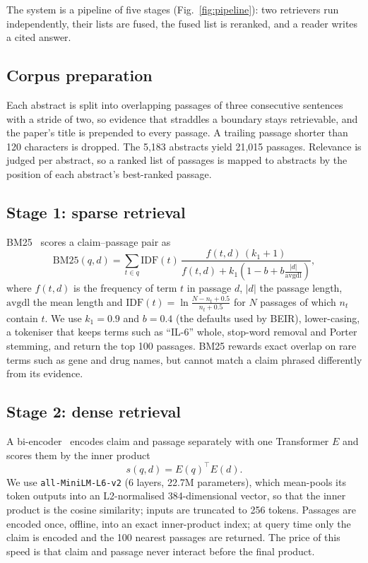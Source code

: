 \documentclass[runningheads]{llncs}
\begin{document}
The system is a pipeline of five stages (Fig.~\ref{fig:pipeline}): two retrievers
run independently, their lists are fused, the fused list is reranked, and a
reader writes a cited answer.

\subsection{Corpus preparation}
Each abstract is split into overlapping passages of three consecutive sentences
with a stride of two, so evidence that straddles a boundary stays retrievable,
and the paper's title is prepended to every passage. A trailing passage shorter
than 120 characters is dropped. The 5{,}183 abstracts yield 21{,}015 passages.
Relevance is judged per abstract, so a ranked list of passages is mapped to
abstracts by the position of each abstract's best-ranked passage.

\subsection{Stage 1: sparse retrieval}
BM25~\cite{robertson2009bm25} scores a claim--passage pair as
\begin{equation}
\mathrm{BM25}(q,d)=\sum_{t \in q}\mathrm{IDF}(t)\,
\frac{f(t,d)\,(k_1+1)}{f(t,d)+k_1\!\left(1-b+b\frac{|d|}{\mathrm{avgdl}}\right)},
\end{equation}
where $f(t,d)$ is the frequency of term $t$ in passage $d$, $|d|$ the passage
length, $\mathrm{avgdl}$ the mean length and
$\mathrm{IDF}(t)=\ln\frac{N-n_t+0.5}{n_t+0.5}$ for $N$ passages of which $n_t$
contain $t$. We use $k_1=0.9$ and $b=0.4$ (the defaults used by BEIR), lower-casing,
a tokeniser that keeps terms such as ``IL-6'' whole, stop-word removal and Porter
stemming, and return the top 100 passages. BM25 rewards exact overlap on rare
terms such as gene and drug names, but cannot match a claim phrased differently
from its evidence.

\subsection{Stage 2: dense retrieval}
A bi-encoder~\cite{reimers2019sbert} encodes claim and passage separately with
one Transformer $E$ and scores them by the inner product
\begin{equation}
s(q,d)=E(q)^{\top}E(d).
\end{equation}
We use \texttt{all-MiniLM-L6-v2} (6 layers, 22.7M parameters), which mean-pools
its token outputs into an L2-normalised 384-dimensional vector, so that the inner
product is the cosine similarity; inputs are truncated to 256 tokens. Passages are
encoded once, offline, into an exact inner-product index; at query time only the
claim is encoded and the 100 nearest passages are returned. The price of this
speed is that claim and passage never interact before the final product.
\end{document}
